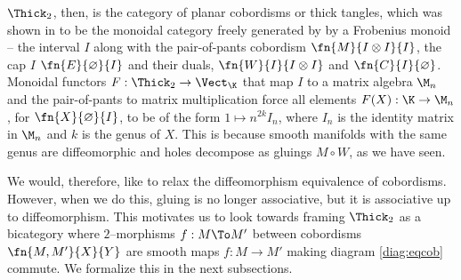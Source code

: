 $\Thick_2$, then, is the category of planar cobordisms or thick tangles, which
was shown in \cite{NonCommTQFT} to be the monoidal category freely generated by
by a Frobenius monoid -- the interval $I$ along with the pair-of-pants cobordism
$\fn{M}{I \otimes I}{I}$, the cap $I$ $\fn{E}{\varnothing}{I}$ and their duals,
$\fn{W}{I}{I \otimes I}$ and $\fn{C}{I}{\varnothing}$. Monoidal functors
$F : \Thick_2 \to \Vect_{\K}$ that map $I$ to a matrix algebra $\M_n$
and the pair-of-pants to matrix multiplication force all elements
$F(X) : \K \to \M_n$, for $\fn{X}{\varnothing}{I}$, to be of the form
$1 \mapsto n^{2k}I_n$, where $I_n$ is the identity matrix in $\M_n$ and $k$ is
the genus of $X$. This is because smooth manifolds with the same genus are
diffeomorphic and holes decompose as gluings $M \circ W$, as we have seen.

We would, therefore, like to relax the diffeomorphism equivalence of cobordisms.
However, when we do this, gluing is no longer associative, but it is associative
up to diffeomorphism.  This motivates us to look towards framing $\Thick_2$ as a
bicategory where $2$--morphisms $f : M \To M'$ between cobordisms $\fn{M,
M'}{X}{Y}$ are smooth maps $f : M \to M'$ making diagram \eqref{diag:eqcob}
commute. We formalize this in the next subsections.


